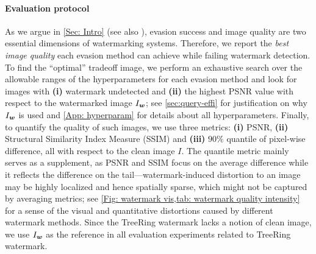 \paragraph{Evaluation protocol}
As we argue in \cref{Sec: Intro} (see also \cite{an2024benchmarking}), evasion success and image quality are two essential dimensions of watermarking systems. Therefore, we report the \emph{best image quality} each evasion method can achieve while failing watermark detection. To find the ``optimal'' tradeoff image, we perform an exhaustive search over the allowable ranges of the hyperparameters for each evasion method and look for images with \textbf{(i)} watermark undetected and \textbf{(ii)} the highest PSNR value with respect to the watermarked image $I_{\boldsymbol w}$; see \cref{sec:query-effi} for justification on why $I_{\boldsymbol w}$ is used and \cref{App: hyperparam} for details about all hyperparameters. Finally, to quantify the quality of such images, we use three metrics: \textbf{(i)} PSNR, \textbf{(ii)} Structural Similarity Index Measure (SSIM) \citep{hore2010image} and \textbf{(iii)} $90 \%$ quantile of pixel-wise difference, all with respect to the clean image $I$. The quantile metric mainly serves as a supplement, as PSNR and SSIM focus on the average difference while it reflects the difference on the tail---watermark-induced distortion to an image may be highly localized and hence spatially sparse, which might not be captured by averaging metrics; see \cref{Fig: watermark vis,tab: watermark quality intensity} for a sense of the visual and quantitative distortions caused by different watermark methods. Since the TreeRing watermark lacks a notion of clean image, we use $I_{\boldsymbol w}$ as the reference in all evaluation experiments related to TreeRing watermark. 



% 





